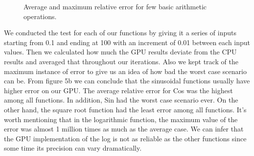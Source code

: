 \begin{figure}[!tbh]
 \centering  
  \caption{Average and maximum relative error for few basic arithmetic operations.}
   \label{fig:histogram_comparison}
\end{figure} 

We conducted the test for each of our functions by giving it a series of inputs starting from 0.1 and ending at 100 with an increment of 0.01 between each input values. Then we calculated how much the GPU results deviate from the CPU results and averaged that throughout our iterations. Also we kept track of the maximum instance of error to give us an idea of how bad the worst case scenario can be. From figure 5b we can conclude that the sinusoidal functions usually have higher error on our GPU. The average relative error for Cos was the highest among all functions. In addition, Sin had the worst case scenario ever. On the other hand, the square root function had the least error among all functions. It's worth mentioning that in the logarithmic function, the maximum value of the error was almost 1 million times as much as the average case. We can infer that the GPU implementation of the log is not as reliable as the other functions since some time its precision can vary dramatically.

